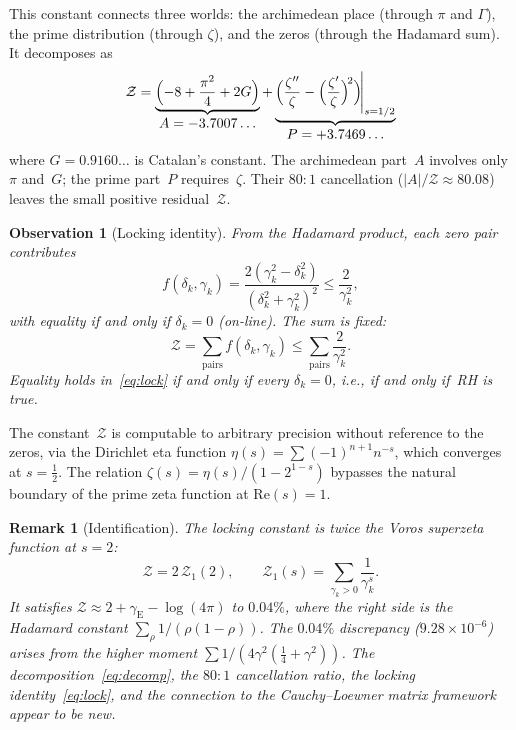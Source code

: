 \documentclass[11pt,a4paper]{article}
\newtheorem{observation}{Observation}[section]
\newtheorem{remark}{Remark}[section]
\begin{document}
This constant connects three worlds: the archimedean place (through $\pi$ and $\Gamma$), the prime distribution (through $\zeta$), and the zeros (through the Hadamard sum). It decomposes as
\begin{equation}\label{eq:decomp}
\mathcal{Z} = \underbrace{\Bigl(-8 + \frac{\pi^2}{4} + 2G\Bigr)}_{\displaystyle A = -3.7007\ldots} + \underbrace{\Bigl(\frac{\zeta''}{\zeta} - \Bigl(\frac{\zeta'}{\zeta}\Bigr)^{\!2}\Bigr)\!\Bigg|_{s=1/2}}_{\displaystyle P = +3.7469\ldots}
\end{equation}
where $G = 0.9160\ldots$ is Catalan's constant. The archimedean part~$A$ involves only $\pi$ and~$G$; the prime part~$P$ requires~$\zeta$. Their $80{:}1$ cancellation ($|A|/\mathcal{Z} \approx 80.08$) leaves the small positive residual~$\mathcal{Z}$.

\begin{observation}[Locking identity]
From the Hadamard product, each zero pair contributes
\begin{equation}
f(\delta_k, \gamma_k) = \frac{2(\gamma_k^2 - \delta_k^2)}{(\delta_k^2 + \gamma_k^2)^2} \leq \frac{2}{\gamma_k^2},
\end{equation}
with equality if and only if $\delta_k = 0$ (on-line). The sum is fixed:
\begin{equation}\label{eq:lock}
\mathcal{Z} = \sum_{\mathrm{pairs}} f(\delta_k, \gamma_k) \leq \sum_{\mathrm{pairs}} \frac{2}{\gamma_k^2}.
\end{equation}
Equality holds in~\eqref{eq:lock} if and only if every $\delta_k = 0$, i.e., if and only if~RH is true.
\end{observation}

The constant~$\mathcal{Z}$ is computable to arbitrary precision without reference to the zeros, via the Dirichlet eta function $\eta(s) = \sum (-1)^{n+1} n^{-s}$, which converges at $s = \tfrac{1}{2}$. The relation $\zeta(s) = \eta(s)/(1 - 2^{1-s})$ bypasses the natural boundary of the prime zeta function at $\mathrm{Re}(s) = 1$.

\begin{remark}[Identification]
The locking constant is twice the Voros superzeta function \cite{Voros2003} at $s = 2$:
\begin{equation}
\mathcal{Z} = 2\,\mathcal{Z}_1(2), \qquad \mathcal{Z}_1(s) = \sum_{\gamma_k > 0} \frac{1}{\gamma_k^s}.
\end{equation}
It satisfies $\mathcal{Z} \approx 2 + \gamma_{\mathrm{E}} - \log(4\pi)$ to $0.04\%$, where the right side is the Hadamard constant $\sum_\rho 1/(\rho(1-\rho))$. The $0.04\%$ discrepancy ($9.28 \times 10^{-6}$) arises from the higher moment $\sum 1/(4\gamma^2(\tfrac{1}{4} + \gamma^2))$. The decomposition~\eqref{eq:decomp}, the $80{:}1$ cancellation ratio, the locking identity~\eqref{eq:lock}, and the connection to the Cauchy--Loewner matrix framework appear to be new.
\end{remark}
\end{document}
